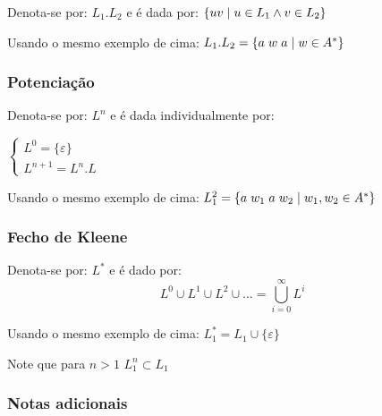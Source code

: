 \documentclass{article}
\begin{document}
\begin{flushleft}
  \item Denota-se por: $L_1.L_2$ e é dada por: $\{u v \hspace{1mm} | \hspace{1mm} u \in L_1 \wedge v \in L_2\}$
  \item Usando o mesmo exemplo de cima: $L_1.L_2 = \{a \hspace{1mm} w \hspace{1mm} a \hspace{1mm} | \hspace{1mm} w \in A^*\}$
\end{flushleft}

\subsubsection{Potenciação}

\begin{flushleft}
  \item Denota-se por: $L^n$ e é dada individualmente por:
  
  $\begin{cases}
    L^0 = \{\varepsilon\}\\
    L^{n+1} = L^n.L
  \end{cases}$
  \item Usando o mesmo exemplo de cima: $L_1^2= \{a \hspace{1mm} w_1 \hspace{1mm} a \hspace{1mm} w_2 \hspace{1mm} | \hspace{1mm} w_1, w_2 \in A^*\}$
\end{flushleft}

\subsubsection{Fecho de Kleene}

\begin{flushleft}
  \item Denota-se por: $L^*$ e é dado por: \[L^0 \cup L^1 \cup L^2 \cup \dots = \bigcup_{i = 0}^\infty  L^i\]
  \item Usando o mesmo exemplo de cima: $L_1^* = L_1 \cup \{\varepsilon\}$
  \item Note que para $n > 1$ $L_1^n \subset L_1$
\end{flushleft}

\subsubsection{Notas adicionais}
\end{document}
